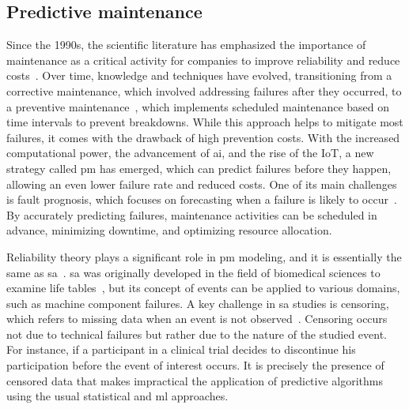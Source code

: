     \subsection{Predictive maintenance}

Since the 1990s, the scientific literature has emphasized the importance of maintenance as a critical activity for companies to improve reliability and reduce costs~\cite{Cho1991, Reinertsen1996}. Over time, knowledge and techniques have evolved, transitioning from a corrective maintenance, which involved addressing failures after they occurred, to a preventive maintenance~\cite{Ran2019}, which implements scheduled maintenance based on time intervals to prevent breakdowns. While this approach helps to mitigate most failures, it comes with the drawback of high prevention costs. With the increased computational power, the advancement of \ac{ai}, and the rise of the IoT, a new strategy called \ac{pm} has emerged, which can predict failures before they happen, allowing an even lower failure rate and reduced costs. One of its main challenges is fault prognosis, which focuses on forecasting when a failure is likely to occur~\cite{Wang2017_paradigm}. By accurately predicting failures, maintenance activities can be scheduled in advance, minimizing downtime, and optimizing resource allocation.

Reliability theory plays a significant role in \ac{pm} modeling, and it is essentially the same as \ac{sa}~\cite{Yang2022_prognostic}. \ac{sa} was originally developed in the field of biomedical sciences to examine life tables~\cite{Cox1972}, but its concept of events can be applied to various domains, such as machine component failures. A key challenge in \ac{sa} studies is censoring, which refers to missing data when an event is not observed~\cite{Leung1997, Gijbels2010}. Censoring occurs not due to technical failures but rather due to the nature of the studied event. For instance, if a participant in a clinical trial decides to discontinue his participation before the event of interest occurs. It is precisely the presence of censored data that makes impractical the application of predictive algorithms using the usual statistical and \ac{ml} approaches.

